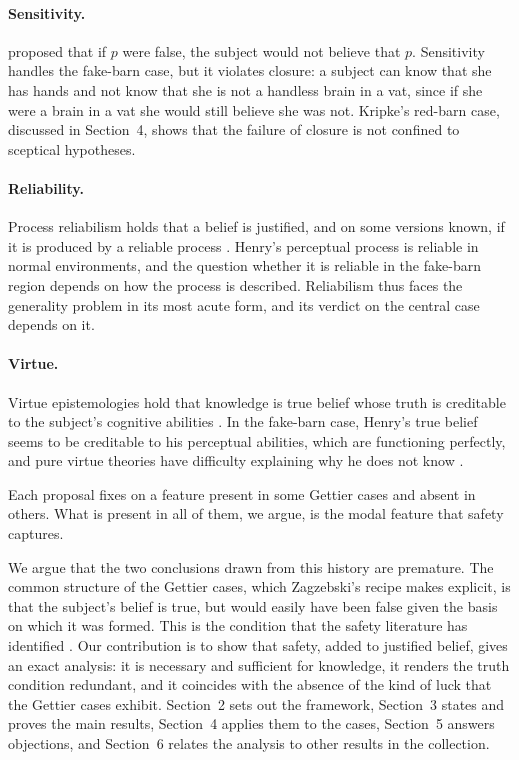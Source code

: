\documentclass{situationist-preprint}
\begin{document}
\paragraph{Sensitivity.} \citet{Nozick1981} proposed that if $p$ were false, the subject would not believe that $p$. Sensitivity handles the fake-barn case, but it violates closure: a subject can know that she has hands and not know that she is not a handless brain in a vat, since if she were a brain in a vat she would still believe she was not. Kripke's red-barn case, discussed in Section~4, shows that the failure of closure is not confined to sceptical hypotheses.

\paragraph{Reliability.} Process reliabilism holds that a belief is justified, and on some versions known, if it is produced by a reliable process \citep{Goldman1979}. Henry's perceptual process is reliable in normal environments, and the question whether it is reliable in the fake-barn region depends on how the process is described. Reliabilism thus faces the generality problem in its most acute form, and its verdict on the central case depends on it.

\paragraph{Virtue.} Virtue epistemologies hold that knowledge is true belief whose truth is creditable to the subject's cognitive abilities \citep{Sosa2007,Greco2010}. In the fake-barn case, Henry's true belief seems to be creditable to his perceptual abilities, which are functioning perfectly, and pure virtue theories have difficulty explaining why he does not know \citep{Pritchard2012}.

Each proposal fixes on a feature present in some Gettier cases and absent in others. What is present in all of them, we argue, is the modal feature that safety captures.

We argue that the two conclusions drawn from this history are premature. The common structure of the Gettier cases, which Zagzebski's recipe makes explicit, is that the subject's belief is true, but would easily have been false given the basis on which it was formed. This is the condition that the safety literature has identified \citep{Sosa1999,Williamson2000,Pritchard2005}. Our contribution is to show that safety, added to justified belief, gives an exact analysis: it is necessary and sufficient for knowledge, it renders the truth condition redundant, and it coincides with the absence of the kind of luck that the Gettier cases exhibit. Section~2 sets out the framework, Section~3 states and proves the main results, Section~4 applies them to the cases, Section~5 answers objections, and Section~6 relates the analysis to other results in the collection.
\end{document}
